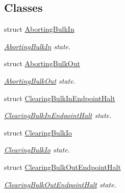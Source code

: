 \subsection*{Classes}
\begin{DoxyCompactItemize}
\item 
struct \hyperlink{structmdt_usbtmc_transfer_handler_state_machine_1_1_running___1_1_aborting_bulk_in}{Aborting\-Bulk\-In}
\begin{DoxyCompactList}\small\item\em \hyperlink{structmdt_usbtmc_transfer_handler_state_machine_1_1_running___1_1_aborting_bulk_in}{Aborting\-Bulk\-In} state. \end{DoxyCompactList}\item 
struct \hyperlink{structmdt_usbtmc_transfer_handler_state_machine_1_1_running___1_1_aborting_bulk_out}{Aborting\-Bulk\-Out}
\begin{DoxyCompactList}\small\item\em \hyperlink{structmdt_usbtmc_transfer_handler_state_machine_1_1_running___1_1_aborting_bulk_out}{Aborting\-Bulk\-Out} state. \end{DoxyCompactList}\item 
struct \hyperlink{structmdt_usbtmc_transfer_handler_state_machine_1_1_running___1_1_clearing_bulk_in_endpoint_halt}{Clearing\-Bulk\-In\-Endpoint\-Halt}
\begin{DoxyCompactList}\small\item\em \hyperlink{structmdt_usbtmc_transfer_handler_state_machine_1_1_running___1_1_clearing_bulk_in_endpoint_halt}{Clearing\-Bulk\-In\-Endpoint\-Halt} state. \end{DoxyCompactList}\item 
struct \hyperlink{structmdt_usbtmc_transfer_handler_state_machine_1_1_running___1_1_clearing_bulk_io}{Clearing\-Bulk\-Io}
\begin{DoxyCompactList}\small\item\em \hyperlink{structmdt_usbtmc_transfer_handler_state_machine_1_1_running___1_1_clearing_bulk_io}{Clearing\-Bulk\-Io} state. \end{DoxyCompactList}\item 
struct \hyperlink{structmdt_usbtmc_transfer_handler_state_machine_1_1_running___1_1_clearing_bulk_out_endpoint_halt}{Clearing\-Bulk\-Out\-Endpoint\-Halt}
\begin{DoxyCompactList}\small\item\em \hyperlink{structmdt_usbtmc_transfer_handler_state_machine_1_1_running___1_1_clearing_bulk_out_endpoint_halt}{Clearing\-Bulk\-Out\-Endpoint\-Halt} state. \end{DoxyCompactList}\item 

\end{DoxyCompactItemize}
